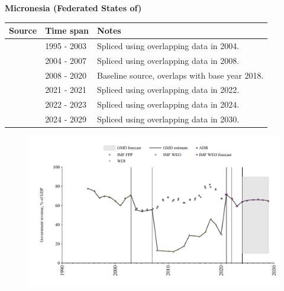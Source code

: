 \documentclass[12pt,a4paper,landscape]{article}
\begin{document}
\begin{adjustbox}{max totalsize={\paperwidth}{\paperheight},center}
\begin{minipage}[t][\textheight][t]{\textwidth}
\vspace*{0.5cm}
{}
\begin{center}
{\Large\bfseries Micronesia (Federated States of)}
\end{center}
\vspace{0.5cm}
\begin{table}[H]
\centering
\small
\begin{tabular}{|l|l|l|}
\hline
\textbf{Source} & \textbf{Time span} & \textbf{Notes} \\
\hline
\rowcolor{white}\cite{IMF_WEO}& 1995 - 2003 &Spliced using overlapping data in 2004.\\
\rowcolor{lightgray}\cite{ADB}& 2004 - 2007 &Spliced using overlapping data in 2008.\\
\rowcolor{white}\cite{WDI}& 2008 - 2020 &Baseline source, overlaps with base year 2018.\\
\rowcolor{lightgray}\cite{ADB}& 2021 - 2021 &Spliced using overlapping data in 2022.\\
\rowcolor{white}\cite{IMF_FPP}& 2022 - 2023 &Spliced using overlapping data in 2024.\\
\rowcolor{lightgray}\cite{IMF_WEO_forecast}& 2024 - 2029 &Spliced using overlapping data in 2030.\\
\hline
\end{tabular}
\end{table}
\begin{figure}[H]
\centering
\includegraphics[width=\textwidth,height=0.6\textheight,keepaspectratio]{graphs/FSM_govrev_GDP.pdf}
\end{figure}
\end{minipage}
\end{adjustbox}
\end{document}
